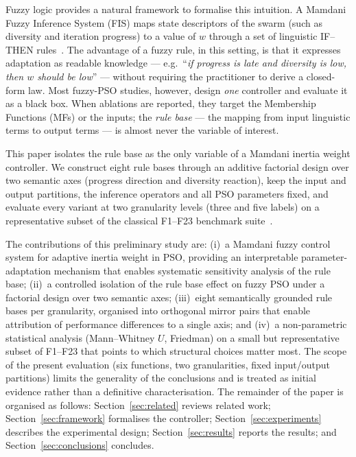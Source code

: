 \documentclass[runningheads]{llncs}
\begin{document}
Fuzzy logic provides a natural framework to formalise this intuition. A Mamdani Fuzzy Inference System (FIS) maps state descriptors of the swarm (such as diversity and iteration progress) to a value of $w$ through a set of linguistic IF--THEN rules~\cite{melin2013,olivas2016}. The advantage of a fuzzy rule, in this setting, is that it expresses adaptation as readable knowledge --- e.g.\ ``\textit{if progress is late and diversity is low, then $w$ should be low}'' --- without requiring the practitioner to derive a closed-form law. Most fuzzy-PSO studies, however, design \emph{one} controller and evaluate it as a black box. When ablations are reported, they target the Membership Functions (MFs) or the inputs; the \emph{rule base} --- the mapping from input linguistic terms to output terms --- is almost never the variable of interest.

This paper isolates the rule base as the only variable of a Mamdani inertia weight controller. We construct eight rule bases through an additive factorial design over two semantic axes (progress direction and diversity reaction), keep the input and output partitions, the inference operators and all PSO parameters fixed, and evaluate every variant at two granularity levels (three and five labels) on a representative subset of the classical F1--F23 benchmark suite~\cite{abualigah2021aoa}.

The contributions of this preliminary study are: (i)~a Mamdani fuzzy control system for adaptive inertia weight in PSO, providing an interpretable parameter-adaptation mechanism that enables systematic sensitivity analysis of the rule base; (ii)~a controlled isolation of the rule base effect on fuzzy PSO under a factorial design over two semantic axes; (iii)~eight semantically grounded rule bases per granularity, organised into orthogonal mirror pairs that enable attribution of performance differences to a single axis; and (iv)~a non-parametric statistical analysis (Mann--Whitney $U$, Friedman) on a small but representative subset of F1--F23 that points to which structural choices matter most. The scope of the present evaluation (six functions, two granularities, fixed input/output partitions) limits the generality of the conclusions and is treated as initial evidence rather than a definitive characterisation. The remainder of the paper is organised as follows: Section~\ref{sec:related} reviews related work; Section~\ref{sec:framework} formalises the controller; Section~\ref{sec:experiments} describes the experimental design; Section~\ref{sec:results} reports the results; and Section~\ref{sec:conclusions} concludes.
\end{document}

